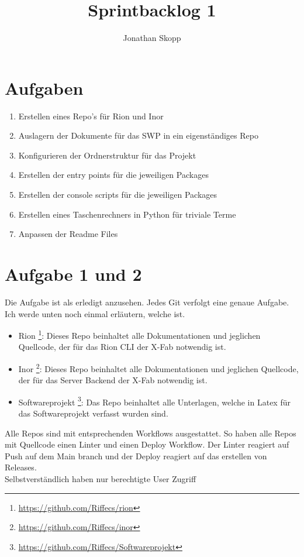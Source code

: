 \documentclass[fleqn,10pt]{olplainarticle}
\title{Sprintbacklog 1}
\author{Jonathan Skopp}
\affil{jonathan-erik.skopp@tu-ilmenau.de}
\begin{document}
\flushbottom
\maketitle
\thispagestyle{empty}

\section*{Aufgaben}
\begin{enumerate}
	\item Erstellen eines Repo's für Rion und Inor
	\item Auslagern der Dokumente für das SWP in ein eigenständiges Repo
	\item Konfigurieren der Ordnerstruktur für das Projekt
	\item Erstellen der entry points für die jeweiligen Packages
	\item Erstellen der console scripts für die jeweiligen Packages
	\item Erstellen eines Taschenrechners in Python für triviale Terme
	\item Anpassen der Readme Files 
\end{enumerate}


\section*{Aufgabe 1 und 2}
Die Aufgabe ist als erledigt anzusehen. Jedes Git verfolgt eine genaue Aufgabe. Ich werde unten noch einmal erläutern, welche ist.  
\begin{itemize}
	\item Rion \footnote{\url{https://github.com/Riffecs/rion}}:  Dieses Repo beinhaltet alle Dokumentationen und jeglichen Quellcode, der für das Rion CLI der X-Fab notwendig ist.
	\item Inor \footnote{\url{https://github.com/Riffecs/inor}}:  Dieses Repo beinhaltet alle Dokumentationen und jeglichen Quellcode, der für das Server Backend der X-Fab notwendig ist.
	\item Softwareprojekt \footnote{\url{https://github.com/Riffecs/Softwareprojekt}}:
	Das Repo beinhaltet alle Unterlagen, welche in Latex für das Softwareprojekt verfasst wurden sind.
\end{itemize}
	
Alle Repos sind mit entsprechenden Workflows ausgestattet. So haben alle Repos mit Quellcode einen Linter und einen Deploy Workflow. Der Linter reagiert auf Push auf dem Main branch und der Deploy reagiert auf das erstellen von Releases.\\
Selbstverständlich haben nur berechtigte User Zugriff	
\end{document}
